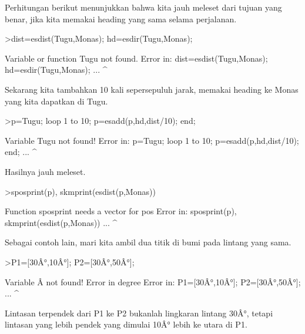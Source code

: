 \documentclass[a4paper,10pt]{article}
\begin{document}
\begin{eulernotebook}
\begin{eulercomment}
\begin{eulercomment}
\begin{eulercomment}
\begin{eulercomment}
\begin{eulercomment}
\begin{eulercomment}
\begin{eulercomment}
\begin{eulercomment}
\begin{eulercomment}
\begin{eulercomment}
\begin{eulercomment}
\begin{eulercomment}
\begin{eulercomment}
\begin{eulercomment}
\begin{eulercomment}
\begin{eulercomment}
\begin{eulercomment}
\begin{eulercomment}
\begin{eulercomment}
Perhitungan berikut menunjukkan bahwa kita jauh meleset dari tujuan yang benar, jika kita
memakai heading yang sama selama perjalanan.
\end{eulercomment}
\begin{eulerprompt}
>dist=esdist(Tugu,Monas); hd=esdir(Tugu,Monas);
\end{eulerprompt}
\begin{euleroutput}
  Variable or function Tugu not found.
  Error in:
  dist=esdist(Tugu,Monas); hd=esdir(Tugu,Monas); ...
                  ^
\end{euleroutput}
\begin{eulercomment}
Sekarang kita tambahkan 10 kali sepersepuluh jarak, memakai heading ke Monas yang kita
dapatkan di Tugu.
\end{eulercomment}
\begin{eulerprompt}
>p=Tugu; loop 1 to 10; p=esadd(p,hd,dist/10); end;
\end{eulerprompt}
\begin{euleroutput}
  Variable Tugu not found!
  Error in:
  p=Tugu; loop 1 to 10; p=esadd(p,hd,dist/10); end; ...
        ^
\end{euleroutput}
\begin{eulercomment}
Hasilnya jauh meleset.
\end{eulercomment}
\begin{eulerprompt}
>sposprint(p), skmprint(esdist(p,Monas))
\end{eulerprompt}
\begin{euleroutput}
  Function sposprint needs a vector for pos
  Error in:
  sposprint(p), skmprint(esdist(p,Monas)) ...
              ^
\end{euleroutput}
\begin{eulercomment}
Sebagai contoh lain, mari kita ambil dua titik di bumi pada lintang yang sama.
\end{eulercomment}
\begin{eulerprompt}
>P1=[30Â°,10Â°]; P2=[30Â°,50Â°];
\end{eulerprompt}
\begin{euleroutput}
  Variable Â not found!
  Error in degree
  Error in:
  P1=[30Â°,10Â°]; P2=[30Â°,50Â°]; ...
          ^
\end{euleroutput}
\begin{eulercomment}
Lintasan terpendek dari P1 ke P2 bukanlah lingkaran lintang 30Â°, tetapi lintasan yang lebih
pendek yang dimulai 10Â° lebih ke utara di P1.
\end{eulercomment}

\end{eulercomment}
\end{eulercomment}
\end{eulercomment}
\end{eulercomment}
\end{eulercomment}
\end{eulercomment}
\end{eulercomment}
\end{eulercomment}
\end{eulercomment}
\end{eulercomment}
\end{eulercomment}
\end{eulercomment}
\end{eulercomment}
\end{eulercomment}
\end{eulercomment}
\end{eulercomment}
\end{eulercomment}
\end{eulercomment}
\end{eulernotebook}
\end{document}
